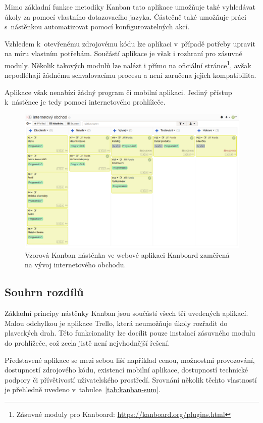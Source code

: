Mimo základní funkce metodiky Kanban tato aplikace umožňuje také vyhledávat úkoly za pomocí vlastního dotazovacího jazyka. Částečně také umožňuje práci s~nástěnkou automatizovat pomocí konfigurovatelných akcí.

Vzhledem k~otevřenému zdrojovému kódu lze aplikaci v~případě potřeby upravit na míru vlastním potřebám. Součástí aplikace je však i rozhraní pro zásuvné moduly. Několik takových modulů lze nalézt i přímo na oficiální stránce\footnote{Zásuvné moduly pro Kanboard: \url{https://kanboard.org/plugins.html}}, avšak nepodléhají žádnému schvalovacímu procesu a není zaručena jejich kompatibilita.

Aplikace však nenabízí žádný program či mobilní aplikaci. Jediný přístup k~nástěnce je tedy pomocí internetového prohlížeče.

\begin{figure}[H]
	\centering
	\includegraphics[width=\textwidth]{obrazky-figures/kanboard.png}
	\caption{Vzorová Kanban nástěnka ve webové aplikaci Kanboard zaměřená na vývoj internetového obchodu.}
\end{figure}

\subsection{Souhrn rozdílů}

Základní principy nástěnky Kanban jsou součástí všech tří uvedených aplikací. Malou odchylkou je aplikace Trello, která neumožňuje úkoly rozřadit do plaveckých drah. Této funkcionality lze docílit pouze instalací zásuvného modulu do prohlížeče, což zcela jistě není nejvhodnější řešení.

Představené aplikace se mezi sebou liší například cenou, možnostmi provozování, dostupností zdrojového kódu, existencí mobilní aplikace, dostupností technické podpory či přívětivostí uživatelského prostředí. Srovnání několik těchto vlastností je přehledně uvedeno v~tabulce~\ref{tab:kanban-sum}. 

